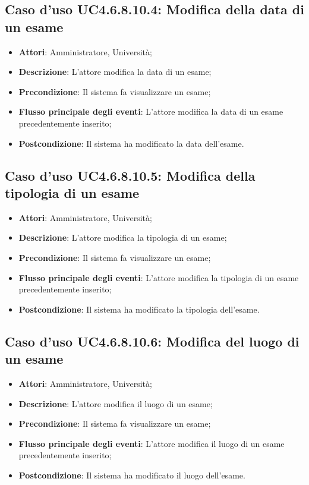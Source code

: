 \subsection{Caso d'uso \texorpdfstring{UC4.6.8.10.4}{UC4.6.8.10.4}: Modifica della data di un esame}
\begin{itemize}
\item \textbf{Attori}: Amministratore, Università;
\item \textbf{Descrizione}: L'attore modifica la data di un esame;

\item \textbf{Precondizione}: Il sistema fa visualizzare un esame;

\item \textbf{Flusso principale degli eventi}: L'attore modifica la data di un esame precedentemente inserito;

\item \textbf{Postcondizione}: Il sistema ha modificato la data dell'esame.

\end{itemize}
\subsection{Caso d'uso \texorpdfstring{UC4.6.8.10.5}{UC4.6.8.10.5}: Modifica della tipologia di un esame}
\begin{itemize}
\item \textbf{Attori}: Amministratore, Università;
\item \textbf{Descrizione}: L'attore modifica la tipologia di un esame;

\item \textbf{Precondizione}: Il sistema fa visualizzare un esame;

\item \textbf{Flusso principale degli eventi}: L'attore modifica la tipologia di un esame precedentemente inserito;

\item \textbf{Postcondizione}: Il sistema ha modificato la tipologia dell’esame.

\end{itemize}
\subsection{Caso d'uso \texorpdfstring{UC4.6.8.10.6}{UC4.6.8.10.6}: Modifica del luogo di un esame}
\begin{itemize}
\item \textbf{Attori}: Amministratore, Università;
\item \textbf{Descrizione}: L'attore modifica il luogo di un esame;

\item \textbf{Precondizione}: Il sistema fa visualizzare un esame;

\item \textbf{Flusso principale degli eventi}: L'attore modifica il luogo di un esame precedentemente inserito;

\item \textbf{Postcondizione}: Il sistema ha modificato il luogo dell'esame.

\end{itemize}
